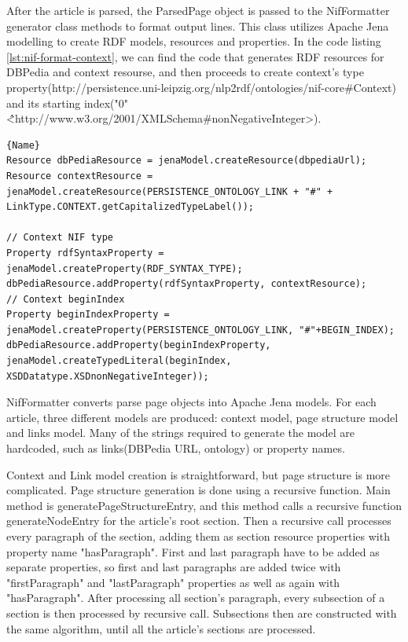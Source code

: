 \documentclass[thesis=M,english,hidelinks]{FITthesis}[2019/12/23]
\begin{document}
After the article is parsed, the ParsedPage object is passed to the NifFormatter generator class methods to format output lines. This class utilizes Apache Jena modelling to create \gls{RDF} models, resources and properties. In the code listing \ref{lst:nif-format-context}, we can find the code that generates \gls{RDF} resources for DBPedia and context resourse, and then proceeds to create context's type property(http://persistence.uni-leipzig.org/nlp2rdf/ontologies/nif-core\#Context) and its starting index("0"\^\^<http://www.w3.org/2001/XMLSchema\#nonNegativeInteger>).

\begin{lstlisting}[caption=Generating Apache Jena context model,frame=tlrb,  label = {lst:nif-format-context}]{Name}
Resource dbPediaResource = jenaModel.createResource(dbpediaUrl);
Resource contextResource = jenaModel.createResource(PERSISTENCE_ONTOLOGY_LINK + "#" + LinkType.CONTEXT.getCapitalizedTypeLabel());

// Context NIF type
Property rdfSyntaxProperty = jenaModel.createProperty(RDF_SYNTAX_TYPE);
dbPediaResource.addProperty(rdfSyntaxProperty, contextResource);
// Context beginIndex
Property beginIndexProperty = jenaModel.createProperty(PERSISTENCE_ONTOLOGY_LINK, "#"+BEGIN_INDEX);
dbPediaResource.addProperty(beginIndexProperty, jenaModel.createTypedLiteral(beginIndex, XSDDatatype.XSDnonNegativeInteger));
\end{lstlisting}

NifFormatter converts parse page objects into Apache Jena models. For each article, three different models are produced: context model, page structure model and links model. Many of the strings required to generate the model are hardcoded, such as links(DBPedia URL, ontology) or property names. 

Context and Link model creation is straightforward, but page structure is more complicated. Page structure generation is done using a  recursive function. Main method is generatePageStructureEntry, and this method calls a recursive function generateNodeEntry for the article's root section. Then a recursive call processes every paragraph of the section, adding them as section resource properties with property name "hasParagraph". First and last paragraph have to be added as separate properties, so first and last paragraphs are added twice with "firstParagraph" and "lastParagraph" properties as well as again with "hasParagraph".  After processing all section's paragraph, every subsection of a section is then processed by recursive call. Subsections then are constructed with the same algorithm, until all the article's sections are processed.
\end{document}
